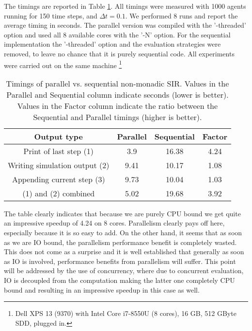 The timings are reported in Table \ref{tab:parallel_nonmonadic_sir_timings}. All timings were measured with 1000 agents running for 150 time steps, and $\Delta t = 0.1$. We performed 8 runs and report the average timing in seconds. The parallel version was compiled with the '-threaded' option and used all 8 available cores with the '-N' option. For the sequential implementation the '-threaded' option and the evaluation strategies were removed, to leave no chance that it is purely sequential code. All experiments were carried out on the same machine \footnote{Dell XPS 13 (9370) with Intel Core i7-8550U (8 cores), 16 GB, 512 GByte SDD, plugged in.}

\begin{table}
	\centering
	\begin{tabular}{ c || c | c | c }
		Output type                   & Parallel & Sequential & Factor \\ \hline
		Print of last step (1)        & 3.9      & 16.38      & 4.24 \\ \hline
		Writing simulation output (2) & 9.41     & 10.17      & 1.08 \\ \hline
		Appending current step (3)    & 9.73     & 10.04      & 1.03 \\ \hline
		(1) and (2) combined	          & 5.02     & 19.68      & 3.92 \\ \hline
	\end{tabular}
	
	\caption[Timings of parallel vs. sequential non-monadic SIR]{Timings of parallel vs. sequential non-monadic SIR. Values in the Parallel and Sequential column indicate seconds (lower is better). Values in the Factor column indicate the ratio between the Sequential and Parallel timings (higher is better).}
	\label{tab:parallel_nonmonadic_sir_timings}
\end{table}

The table clearly indicates that because we are purely CPU bound we get quite an impressive speedup of 4.24 on 8 cores. Parallelism clearly pays off here, especially because it is so easy to add. On the other hand, it seems that as soon as we are IO bound, the parallelism performance benefit is completely wasted. This does not come as a surprise and it is well established that generally as soon as IO is involved, performance benefits from parallelism will suffer. This point will be addressed by the use of concurrency, where due to concurrent evaluation, IO is decoupled from the computation making the latter one completely CPU bound and resulting in an impressive speedup in this case as well.

